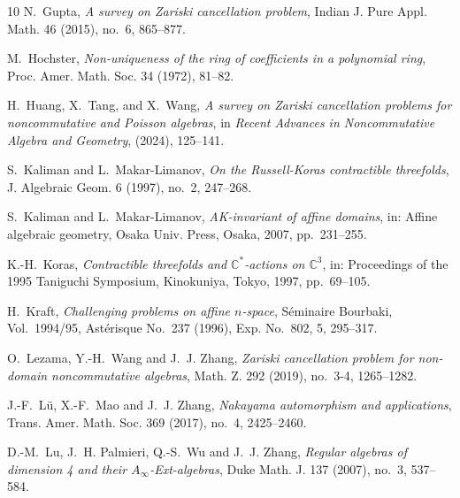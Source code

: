 \documentclass{amsart}
\theoremstyle{plain}
\numberwithin{theorem}{section}
\numberwithin{equation}{theorem}
\theoremstyle{definition}
\begin{document}
\begin{thebibliography}{10}
N.~Gupta,
\emph{A survey on Zariski cancellation problem},
Indian J. Pure Appl. Math. 46 (2015), no.~6, 865--877.

M.~Hochster,
\emph{Non-uniqueness of the ring of coefficients in a polynomial ring},
Proc. Amer. Math. Soc. 34 (1972), 81--82.



H.~Huang, X.~Tang, and X.~Wang,
\emph{A survey on Zariski cancellation problems for noncommutative and Poisson algebras},
in \emph{Recent Advances in Noncommutative Algebra and Geometry},
(2024), 125--141.



S.~Kaliman and L.~Makar-Limanov,
\emph{On the Russell-Koras contractible threefolds},
J. Algebraic Geom. 6 (1997), no.~2, 247--268.



S.~Kaliman and L.~Makar-Limanov,
\emph{AK-invariant of affine domains},
in: Affine algebraic geometry, Osaka Univ. Press, Osaka, 2007, pp.~231--255.


K.-H.~Koras, 
\emph{Contractible threefolds and $\mathbb{C}^*$-actions on $\mathbb{C}^3$}, 
in: Proceedings of the 1995 Taniguchi Symposium, 
Kinokuniya, Tokyo, 1997, pp.~69--105.

H.~Kraft,
\emph{Challenging problems on affine $n$-space},
S\'eminaire Bourbaki, Vol.~1994/95, Ast\'erisque No.~237 (1996), Exp. No.~802, 5, 295--317.


O.~Lezama, Y.-H.~Wang and J.~J. Zhang,
\emph{Zariski cancellation problem for non-domain noncommutative algebras},
Math. Z. 292 (2019), no.~3-4, 1265--1282.


J.-F.~L\"u, X.-F.~Mao and J.~J. Zhang,
\emph{Nakayama automorphism and applications},
Trans. Amer. Math. Soc. 369 (2017), no.~4, 2425--2460.

D.-M.~Lu, J.~H. Palmieri, Q.-S.~Wu and J.~J. Zhang,
\emph{Regular algebras of dimension 4 and their $A_{\infty}$-Ext-algebras},
Duke Math. J. 137 (2007), no.~3, 537--584.


\end{thebibliography}
\end{document}
